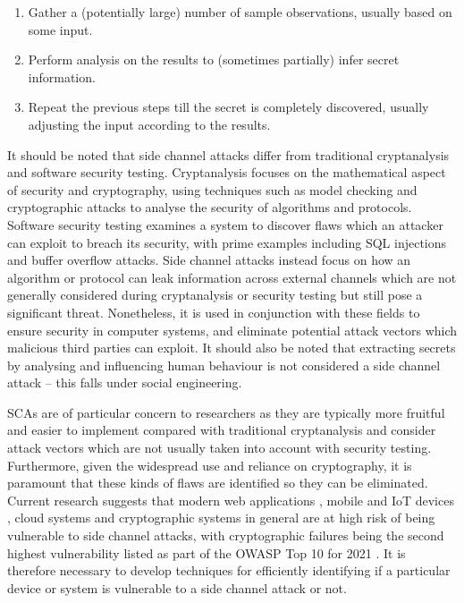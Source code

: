 \documentclass[a4paper,oneside,11pt]{article}
\begin{document}
\begin{enumerate}
	\item{Gather a (potentially large) number of sample observations,
		usually based on some input.}
	\item{Perform analysis on the results to (sometimes partially) infer
		secret information.}
	\item{Repeat the previous steps till the secret is completely
		discovered, usually adjusting the input according to the
		results.}
\end{enumerate}

It should be noted that side channel attacks differ from traditional
cryptanalysis and software security testing. Cryptanalysis focuses on the
mathematical aspect of security and cryptography, using techniques such as
model checking and cryptographic attacks to analyse the security of algorithms
and protocols. Software security testing examines a system to discover flaws
which an attacker can exploit to breach its security, with prime examples
including SQL injections and buffer overflow attacks. Side channel attacks
instead focus on how an algorithm or protocol can leak information across
external channels which are not generally considered during cryptanalysis or
security testing but still pose a significant threat. Nonetheless, it is used
in conjunction with these fields to ensure security in computer systems, and
eliminate potential attack vectors which malicious third parties can exploit.
It should also be noted that extracting secrets by analysing and influencing
human behaviour is not considered a side channel attack -- this falls under
social engineering.

SCAs are of particular concern to researchers as they are typically more
fruitful and easier to implement compared with traditional cryptanalysis and
consider attack vectors which are not usually taken into account with security
testing. Furthermore, given the widespread use and reliance on cryptography, it
is paramount that these kinds of flaws are identified so they can be
eliminated. Current research suggests that modern web applications
\cite{A/Chen-2010-SCA-Web}, mobile and IoT devices \cite{A/Lyu-2018-SCA-IoT},
cloud systems \cite{A/Bazm-2017-SCA-Cloud} and cryptographic systems in general
\cite{A/Zhou-2005-SCA-Cryptography} are at high risk of being vulnerable to
side channel attacks, with cryptographic failures being the second highest
vulnerability listed as part of the OWASP Top 10 for 2021
\cite{W/OWASP-Top-10}. It is therefore necessary to develop techniques for
efficiently identifying if a particular device or system is vulnerable to a
side channel attack or not.
\end{document}
